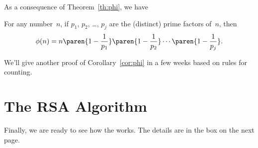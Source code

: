As a consequence of Theorem~\ref{th:phi}, we have
\begin{corollary}\label{cor:phi}
For any number~$n$, if $p_1$, $p_2$, \dots, $p_j$ are the (distinct)
prime factors of~$n$, then
\begin{equation*}
    \phi(n) =  n \paren{1 - \frac{1}{p_1}}
                 \paren{1 - \frac{1}{p_2}}
                 \cdots
                 \paren{1 - \frac{1}{p_j}}.
 \end{equation*}
\end{corollary}
We'll give another proof of Corollary~\ref{cor:phi} in a few weeks
based on rules for counting.

\iffalse
are all those of the form
$mp$.  For $mp$ to be in the interval, $m$ can take any value from 0 to
$p^{k-1}-1$ and no others, so there are exactly $p^{k-1}$ numbers in the
interval that are divisible by $p$.  Now $\phi(p^{k})$ equals the number
of remaining elements in the interval, namely, $p^k -p^{k-1}$.
\fi

\begin{problems}
\practiceproblems
{}

\classproblems
{}

\homeworkproblems
{}

\examproblems
{}
\end{problems}


\section{The RSA Algorithm}\label{RSA_sec}
Finally, we are ready to see how the  works.  The details are in the box on the next page.

